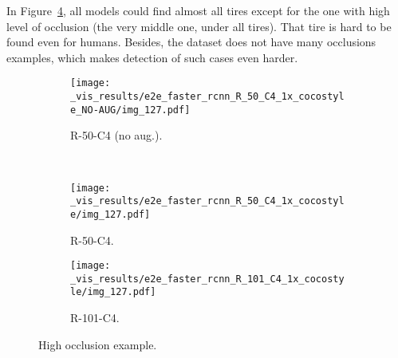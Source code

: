%
%
%

In Figure~\ref{fig:occlusion}, all models could find almost all tires except for the one with high level of occlusion (the very middle one, under all tires).
That tire is hard to be found even for humans.
Besides, the dataset does not have many occlusions examples, which makes detection of such cases even harder.
%
\begin{figure}[th!]
  \centering
  \begin{subfigure}[t]{.85\linewidth}
    \centering
    \texttt{[image: \_vis\_results/e2e\_faster\_rcnn\_R\_50\_C4\_1x\_cocostyle\_NO-AUG/img\_127.pdf]}
    \caption{R-50-C4 (no aug.).}
    \label{fig:occlusion_50N}
  \end{subfigure}\\
  \begin{subfigure}[t]{0.85\linewidth}
    \centering
    \texttt{[image: \_vis\_results/e2e\_faster\_rcnn\_R\_50\_C4\_1x\_cocostyle/img\_127.pdf]}
    \caption{R-50-C4.}
    \label{fig:occlusion_50}
  \end{subfigure}
  \begin{subfigure}[t]{0.85\linewidth}
    \centering
    \texttt{[image: \_vis\_results/e2e\_faster\_rcnn\_R\_101\_C4\_1x\_cocostyle/img\_127.pdf]}
    \caption{R-101-C4.}
    \label{fig:occlusion_101}
  \end{subfigure}
  \caption{High occlusion example.}
  \label{fig:occlusion}
\end{figure}

